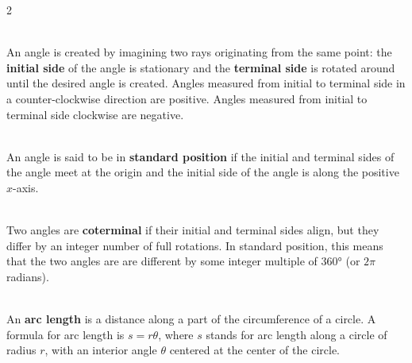 \begin{multicols}{2}
	\begin{myDefinition}~\\[0.5mm]
		An angle is created by imagining two rays originating from the same point: the \textbf{initial side} of the angle is stationary and the \textbf{terminal side} is rotated around until the desired angle is created. Angles measured from initial to terminal side in a counter-clockwise direction are positive. Angles measured from initial to terminal side clockwise are negative.
	\end{myDefinition}
	\begin{myDefinition}~\\[0.5mm]
		An angle is said to be in \textbf{standard position} if the initial and terminal sides of the angle meet at the origin and the initial side of the angle is along the positive $x$-axis.
	\end{myDefinition}
	\begin{myDefinition}[{Coterminal}]~\\[0.5mm]
		Two angles are \textbf{coterminal} if their initial and terminal sides align, but they differ by an integer number of full rotations. In standard position, this means that the two angles are  are different by some integer multiple of $\ang{360}$ (or $2\pi$ radians).
	\end{myDefinition}
	\begin{myDefinition}~\\[0.5mm]
		An \textbf{arc length} is a distance along a part of the circumference of a circle. A formula for arc length is $s=r\theta$, where $s$ stands for arc length along a circle of radius $r$, with an interior angle $\theta$ centered at the center of the circle.
	\end{myDefinition}
	
	\begin{center}
		\captionsetup{type=figure} 
\end{center}
\end{multicols}
